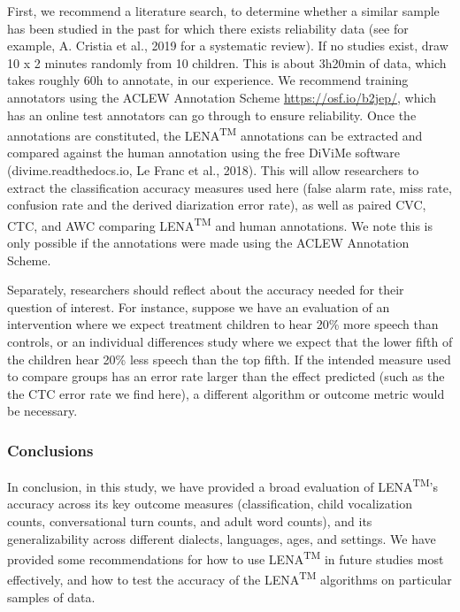 \documentclass[english,floatsintext,man]{apa6}
\begin{document}
First, we recommend a literature search, to determine whether a similar
sample has been studied in the past for which there exists reliability
data (see for example, A. Cristia et al., 2019 for a systematic review).
If no studies exist, draw 10 x 2 minutes randomly from 10 children. This
is about 3h20min of data, which takes roughly 60h to annotate, in our
experience. We recommend training annotators using the ACLEW Annotation
Scheme \url{https://osf.io/b2jep/}, which has an online test annotators
can go through to ensure reliability. Once the annotations are
constituted, the LENA\textsuperscript{TM} annotations can be extracted
and compared against the human annotation using the free DiViMe software
(divime.readthedocs.io, Le Franc et al., 2018). This will allow
researchers to extract the classification accuracy measures used here
(false alarm rate, miss rate, confusion rate and the derived diarization
error rate), as well as paired CVC, CTC, and AWC comparing
LENA\textsuperscript{TM} and human annotations. We note this is only
possible if the annotations were made using the ACLEW Annotation Scheme.

Separately, researchers should reflect about the accuracy needed for
their question of interest. For instance, suppose we have an evaluation
of an intervention where we expect treatment children to hear 20\% more
speech than controls, or an individual differences study where we expect
that the lower fifth of the children hear 20\% less speech than the top
fifth. If the intended measure used to compare groups has an error rate
larger than the effect predicted (such as the the CTC error rate we find
here), a different algorithm or outcome metric would be necessary.

\subsubsection{Conclusions}\label{conclusions}

In conclusion, in this study, we have provided a broad evaluation of
LENA\textsuperscript{TM}'s accuracy across its key outcome measures
(classification, child vocalization counts, conversational turn counts,
and adult word counts), and its generalizability across different
dialects, languages, ages, and settings. We have provided some
recommendations for how to use LENA\textsuperscript{TM} in future
studies most effectively, and how to test the accuracy of the
LENA\textsuperscript{TM} algorithms on particular samples of data.
\end{document}
